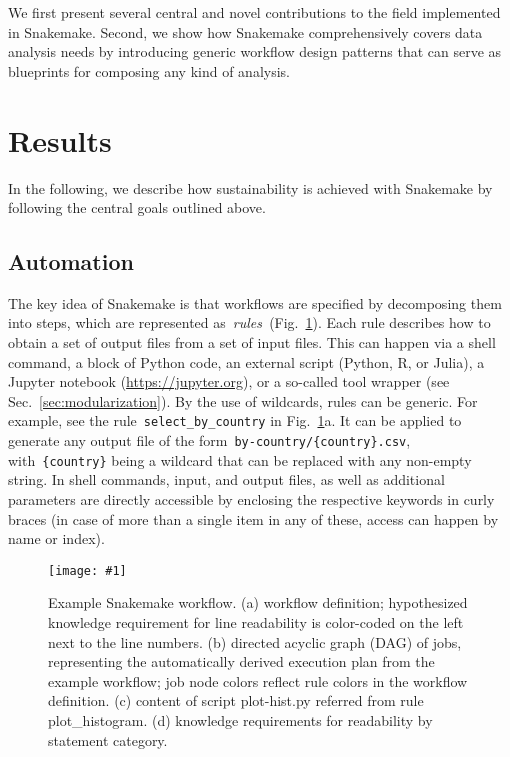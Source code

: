 \documentclass[parskip=half]{scrartcl}
\newcommand{\image}[1]{\centering\texttt{[image: \#1]}}
\let\plainurl\url
\renewcommand{\url}[1]{\protect\plainurl{#1}}
\begin{document}
We first present several central and novel contributions to the field implemented in Snakemake.
Second, we show how Snakemake comprehensively covers data analysis needs by introducing generic workflow design patterns that can serve as blueprints for composing any kind of analysis.

\section{Results}

In the following, we describe how sustainability is achieved with Snakemake by following the central goals outlined above.

\subsection{Automation}

The key idea of Snakemake is that workflows are specified by decomposing them into steps, which are represented as~\emph{rules~}(Fig.~\ref{fig:example}).
Each rule describes how to obtain a set of output files from a set of input files.
This can happen via a shell command, a block of Python code, an external script (Python, R, or Julia), a Jupyter notebook (\url{https://jupyter.org}), or a so-called tool wrapper (see Sec.~\ref{sec:modularization}).
By the use of wildcards, rules can be generic.
For example, see the rule~\lstinline!select_by_country! in Fig.~\ref{fig:example}a.
It can be applied to generate any output file of the form~\lstinline!by-country/{country}.csv!, with~\lstinline!{country}! being a wildcard that can be replaced with any non-empty string.
In shell commands, input, and output files, as well as additional parameters are directly accessible by enclosing the respective keywords in curly braces (in case of more than a single item in any of these, access can happen by name or index).

\begin{figure}
	\image{example-workflow.pdf}
	\caption{
		Example Snakemake workflow. (a) workflow definition; hypothesized knowledge requirement for line readability is color-coded on the left next to the line numbers. (b) directed acyclic graph (DAG) of jobs, representing the automatically derived execution plan from the example workflow; job node colors reflect rule colors in the workflow definition. (c) content of script plot-hist.py referred from rule plot\_histogram. (d) knowledge requirements for readability by statement category.
	}
	\label{fig:example}
\end{figure}
\end{document}
